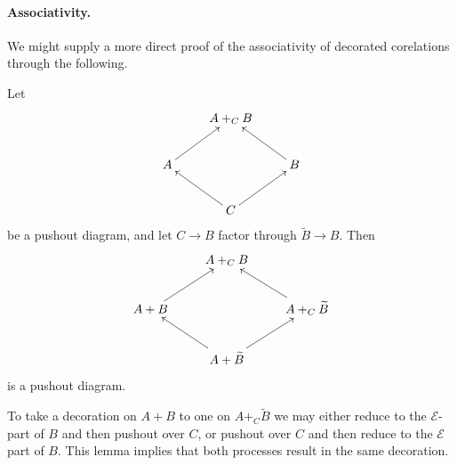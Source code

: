 \paragraph{Associativity.}

We might supply a more direct proof of the associativity of decorated
corelations through the following.
\begin{lemma}
  Let 
  \[
    \xymatrix{
      & A+_CB \\
      A \ar[ur] && B \ar[ul] \\
      & C \ar[ul] \ar[ur]
    }
  \]
  be a pushout diagram, and let $C \to B$ factor through $\widetilde B \to B$.
  Then
  \[
    \xymatrix{
      & A+_CB \\
      A+B \ar[ur] && A+_C \widetilde B \ar[ul] \\
      & A+\widetilde B \ar[ul] \ar[ur]
    }
  \]
  is a pushout diagram.
\end{lemma}

To take a decoration on $A+B$ to one on $A+_C\widetilde B$ we may either reduce to
the $\mathcal E$-part of $B$ and then pushout over $C$, or pushout over $C$ and
then reduce to the $\mathcal E$ part of $B$. This lemma implies that both
processes result in the same decoration.



